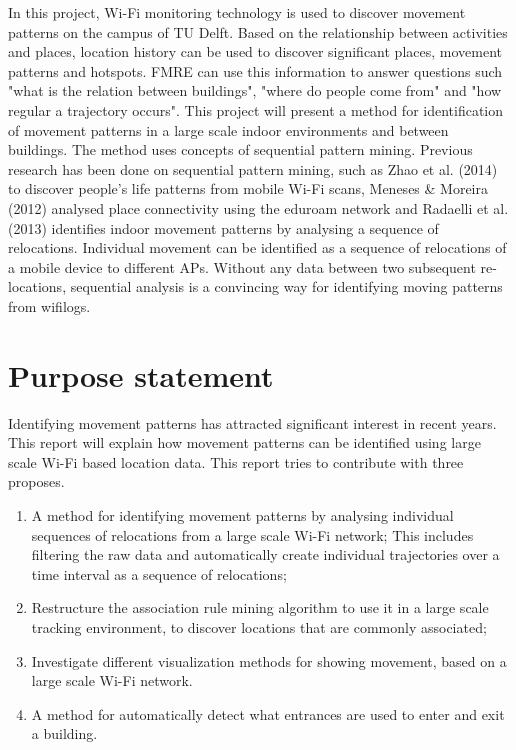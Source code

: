 In this project, Wi-Fi monitoring technology is used to discover movement
patterns on the campus of TU Delft. Based on the relationship between activities and places, location history can be used to discover significant places, movement patterns and hotspots. FMRE can use this information to answer questions such "what is the relation between buildings", "where do people come from" and "how regular a trajectory occurs". This project will present a method for identification of movement patterns in a large scale indoor environments and between buildings. The method uses concepts of sequential pattern mining. Previous research has been done on sequential pattern mining, such as Zhao et al. (2014) to discover people’s life patterns from mobile Wi-Fi scans, Meneses \& Moreira (2012) analysed place connectivity using the eduroam network and Radaelli et al. (2013) identifies indoor movement patterns by analysing a sequence of relocations. Individual movement can be identified as a sequence of relocations of a mobile device to different APs. Without any data between two subsequent re-locations, sequential analysis is a convincing way for identifying moving patterns from wifilogs.

\section{Purpose statement}\label{purpstate}
Identifying movement patterns has attracted significant interest in recent years. This report will explain how movement patterns can be identified using large scale Wi-Fi based location data. This report tries to contribute with three proposes.
\begin{enumerate}
\item A method for identifying movement patterns by analysing individual sequences of relocations from a large scale Wi-Fi network; This includes filtering the raw data and automatically create individual trajectories over a time interval as a sequence of relocations; 
\item Restructure the association rule mining algorithm to use it in a large scale tracking environment, to discover locations that are commonly associated; 
\item Investigate different visualization methods for showing movement, based on a large scale Wi-Fi network. 
\item A method for automatically detect what entrances are used to enter and exit a building.
\end {enumerate}

